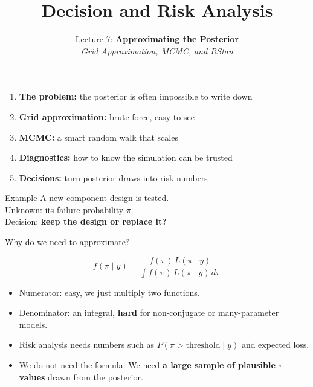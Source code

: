 \documentclass[aspectratio=43,11pt]{beamer}
\title{Decision and Risk Analysis}
\subtitle{Lecture 7: \textbf{Approximating the Posterior}\\
{\it Grid Approximation, MCMC, and RStan}
}
\author{}
\date{
\color{aggiemaroon}{
DAEN 427 / ISEN 427 / ISEN 627 - Fall 2026\\
\textbf{Alexander Abuabara}
}
}
\begin{document}
\begin{frame}
  \titlepage
\end{frame}

\begin{frame}{}
  \begin{enumerate}
    \item \textbf{The problem:} the posterior is often impossible to write down
    \item \textbf{Grid approximation:} brute force, easy to see
    \item \textbf{MCMC:} a smart random walk that scales
    \item \textbf{Diagnostics:} how to know the simulation can be trusted
    \item \textbf{Decisions:} turn posterior draws into risk numbers
  \end{enumerate}
  \vspace{4pt}
  \begin{block}{Example}
    A new component design is tested.\\
    Unknown: its failure probability $\pi$.\\
    Decision: \textbf{keep the design or replace it?}
  \end{block}
\end{frame}

\begin{frame}{Why do we need to approximate?}
  \begin{center}
  \end{center}
  \[
    f(\pi\mid y)=\frac{f(\pi)\,L(\pi\mid y)}{\displaystyle\int f(\pi)\,L(\pi\mid y)\,d\pi}
  \]
  \begin{itemize}
    \item Numerator: easy, we just multiply two functions.
    \item Denominator: an integral, \textbf{hard} for non-conjugate or many-parameter models.
    \item Risk analysis needs numbers such as $P(\pi>\text{threshold}\mid y)$ and expected loss.
    \item We do not need the formula. We need \textbf{a large sample of plausible $\pi$ values} drawn
    from the posterior.
  \end{itemize}
\end{frame}
\end{document}
